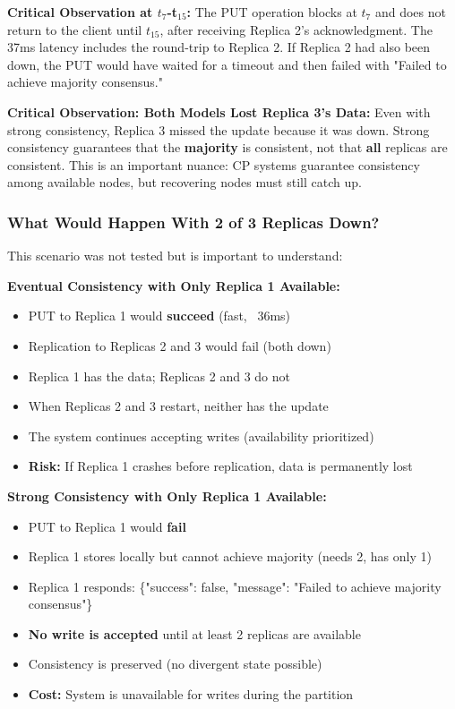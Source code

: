 \documentclass[10pt,a4paper]{article}
\begin{document}
\textbf{Critical Observation at $t_7$-t$_{15}$:} The PUT operation blocks at $t_7$ and does not return to the client until $t_{15}$, after receiving Replica 2's acknowledgment. The 37ms latency includes the round-trip to Replica 2. If Replica 2 had also been down, the PUT would have waited for a timeout and then failed with "Failed to achieve majority consensus."

\textbf{Critical Observation: Both Models Lost Replica 3's Data:} Even with strong consistency, Replica 3 missed the update because it was down. Strong consistency guarantees that the \textbf{majority} is consistent, not that \textbf{all} replicas are consistent. This is an important nuance: CP systems guarantee consistency among available nodes, but recovering nodes must still catch up.

\subsubsection{What Would Happen With 2 of 3 Replicas Down?}

This scenario was not tested but is important to understand:

\textbf{Eventual Consistency with Only Replica 1 Available:}
\begin{itemize}
    \item PUT to Replica 1 would \textbf{succeed} (fast, ~36ms)
    \item Replication to Replicas 2 and 3 would fail (both down)
    \item Replica 1 has the data; Replicas 2 and 3 do not
    \item When Replicas 2 and 3 restart, neither has the update
    \item The system continues accepting writes (availability prioritized)
    \item \textbf{Risk:} If Replica 1 crashes before replication, data is permanently lost
\end{itemize}

\textbf{Strong Consistency with Only Replica 1 Available:}
\begin{itemize}
    \item PUT to Replica 1 would \textbf{fail}
    \item Replica 1 stores locally but cannot achieve majority (needs 2, has only 1)
    \item Replica 1 responds: \{"success": false, "message": "Failed to achieve majority consensus"\}
    \item \textbf{No write is accepted} until at least 2 replicas are available
    \item Consistency is preserved (no divergent state possible)
    \item \textbf{Cost:} System is unavailable for writes during the partition
\end{itemize}
\end{document}
